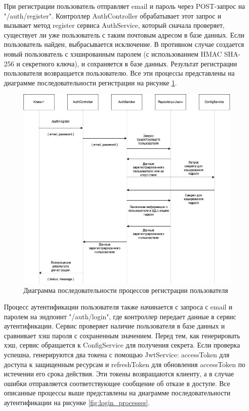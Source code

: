 	При регистрации пользователь отправляет email и пароль через POST-запрос на "/auth/register". Контроллер AuthController обрабатывает этот запрос и вызывает метод register сервиса AuthService, который сначала проверяет, существует ли уже пользователь с таким почтовым адресом в базе данных. Если пользователь найден, выбрасывается исключение. В противном случае создается новый пользователь с хэшированным паролем (с использованием HMAC SHA-256 и секретного ключа), и сохраняется в базе данных. Результат регистрации пользователя возвращается пользователю. Все эти процессы представлены на диаграмме последовательности регистрации на рисунке \ref{fig:register_processes}.

	\begin{figure}[ht!] 
		\center
		\includegraphics [scale=0.4] {my_folder/images//register_processes}
		\caption{Диаграмма последовательности процессов регистрации пользователя} 
		\label{fig:register_processes}  
	\end{figure}

	Процесс аутентификации пользователя также начинается с запроса с email и паролем на эндпоинт "/auth/login", где контроллер передает данные в сервис аутентификации. Сервис проверяет наличие пользователя в базе данных и сравнивает хэш пароля с сохраненным значением. Перед тем, как генерировать хэш, сервис обращается к ConfigService для получения секрета. Если проверка успешна, генерируются два токена с помощью JwtService: accessToken для доступа к защищенным ресурсам и refreshToken для обновления accessToken по истечении его срока действия. Эти токены возвращаются клиенту, а в случае ошибки отправляется соответствующее сообщение об отказе в доступе. Все описанные процессы выше представлены на диаграмме последовательности аутентификации на рисунке \ref{fig:login_processes}.

